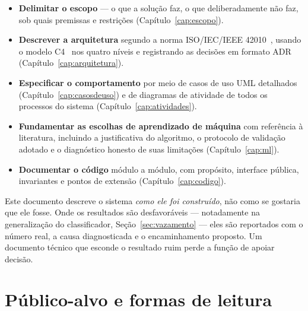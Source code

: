 \begin{itemize}
  \item \textbf{Delimitar o escopo} --- o que a solução faz, o que
    deliberadamente não faz, sob quais premissas e restrições
    (Capítulo~\ref{cap:escopo}).
  \item \textbf{Descrever a arquitetura} segundo a norma
    ISO/IEC/IEEE 42010~\cite{iso42010}, usando o modelo
    C4~\cite{brown2026c4} nos quatro níveis e registrando as decisões em
    formato ADR~\cite{nygard2011adr} (Capítulo~\ref{cap:arquitetura}).
  \item \textbf{Especificar o comportamento} por meio de casos de uso UML
    detalhados (Capítulo~\ref{cap:casosdeuso}) e de diagramas de atividade de
    todos os processos do sistema (Capítulo~\ref{cap:atividades}).
  \item \textbf{Fundamentar as escolhas de aprendizado de máquina} com
    referência à literatura, incluindo a justificativa do algoritmo, o protocolo
    de validação adotado e o diagnóstico honesto de suas limitações
    (Capítulo~\ref{cap:ml}).
  \item \textbf{Documentar o código} módulo a módulo, com propósito,
    interface pública, invariantes e pontos de extensão
    (Capítulo~\ref{cap:codigo}).
\end{itemize}

\begin{nota}
Este documento descreve o sistema \emph{como ele foi construído}, não como se
gostaria que ele fosse. Onde os resultados são desfavoráveis --- notadamente na
generalização do classificador, Seção~\ref{sec:vazamento} --- eles são
reportados com o número real, a causa diagnosticada e o encaminhamento
proposto. Um documento técnico que esconde o resultado ruim perde a função de
apoiar decisão.
\end{nota}

\section{Público-alvo e formas de leitura}

